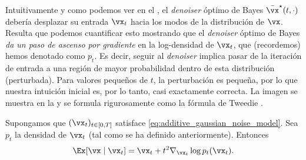 \documentclass[../../book-main.tex]{subfiles}
\begin{document}
Intuitivamente y como podemos ver en el
, el \textit{denoiser} óptimo de Bayes
\(\bar{\vx}^{\star}(t, \cdot)\) debería desplazar su entrada \(\vx_{t}\)
hacia los modos de la distribución de \(\vx\). Resulta que podemos
cuantificar esto mostrando que el \textit{denoiser} óptimo de Bayes
\textit{da un paso de ascenso por gradiente} en la log-densidad 
de \(\vx_{t}\), que (recordemos) hemos denotado como \(p_{t}\). Es decir,
seguir al \textit{denoiser} implica pasar de la iteración de entrada a una
región de mayor probabilidad dentro de esta distribución (perturbada). Para valores 
pequeños de \(t\), la perturbación es pequeña, por lo que nuestra intuición inicial 
es, por lo tanto, casi exactamente correcta. La imagen se muestra en la
 y se formula rigurosamente como
la fórmula de Tweedie \cite{Robbins1956AnEB}.
\begin{theorem}\label{thm:tweedie}
    Supongamos que \((\vx_{t})_{t \in [0, T]}\) satisface
    \eqref{eq:additive_gaussian_noise_model}. Sea \(p_{t}\) la
    densidad de \(\vx_{t}\) (tal como se ha definido anteriormente). Entonces
    \begin{equation}\label{eq:tweedie}
        \Ex[\vx \mid \vx_{t}] = \vx_{t} + t^{2}\nabla_{\vx_{t}} \log
        p_{t}(\vx_{t}).
    \end{equation}
\end{theorem}
\end{document}
